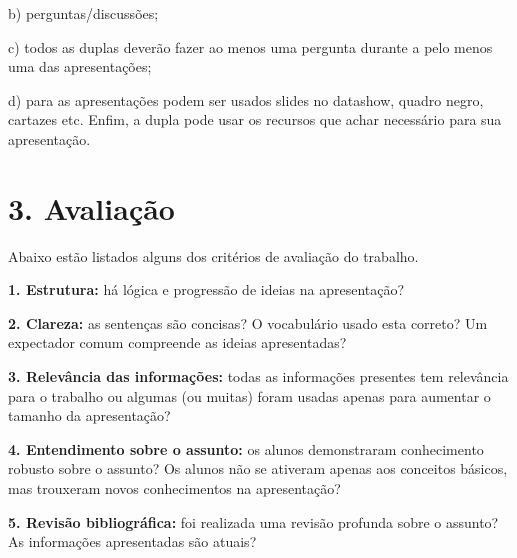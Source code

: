 \documentclass[a4paper,10pt]{article}
\begin{document}
    b) perguntas/discussões;

    c) todos as duplas deverão fazer ao menos uma pergunta durante a pelo menos uma das apresentações;

    d) para as apresentações podem ser usados slides no datashow, quadro negro, cartazes etc. Enfim, a dupla pode usar os recursos que achar necessário para sua apresentação.


   \section* {3. Avaliação}
   \noindent

    Abaixo estão listados alguns dos critérios de avaliação do trabalho.

    \textbf{1. Estrutura:} há lógica e progressão de ideias na apresentação?

    \textbf{2. Clareza:} as sentenças são concisas? O vocabulário usado esta correto? Um expectador comum compreende as ideias apresentadas?

     \textbf{3. Relevância das informações:} todas as informações presentes tem relevância para o trabalho ou algumas (ou muitas) foram usadas apenas para aumentar o tamanho da apresentação?

    \textbf{4. Entendimento sobre o assunto:} os alunos demonstraram conhecimento robusto sobre o assunto? Os alunos não se ativeram apenas aos conceitos básicos, mas trouxeram  novos conhecimentos na apresentação?

    \textbf {5. Revisão bibliográfica:} foi realizada uma revisão profunda sobre o assunto? As informações apresentadas são atuais?


\vspace{10ex}

\end{document}
